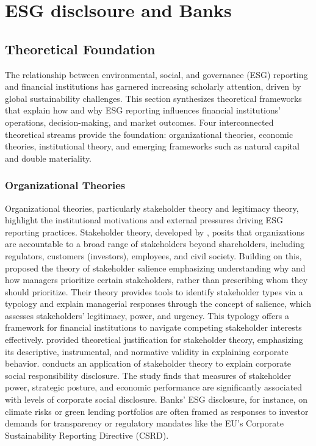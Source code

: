 \documentclass[
  authoryear]{elsarticle}
\begin{document}
\section{ESG disclsoure and Banks}\label{esg-disclsoure-and-banks}

\subsection{Theoretical Foundation}\label{theoretical-foundation}

The relationship between environmental, social, and governance (ESG)
reporting and financial institutions has garnered increasing scholarly
attention, driven by global sustainability challenges. This section
synthesizes theoretical frameworks that explain how and why ESG
reporting influences financial institutions' operations,
decision-making, and market outcomes. Four interconnected theoretical
streams provide the foundation: organizational theories, economic
theories, institutional theory, and emerging frameworks such as natural
capital and double materiality.

\subsubsection{Organizational Theories}\label{organizational-theories}

Organizational theories, particularly stakeholder theory and legitimacy
theory, highlight the institutional motivations and external pressures
driving ESG reporting practices. Stakeholder theory, developed by
\citet{FREEMAN1984}, posits that organizations are accountable to a
broad range of stakeholders beyond shareholders, including regulators,
customers (investors), employees, and civil society. Building on this,
\citet{MITCHELL1997} proposed the theory of stakeholder salience
emphasizing understanding why and how managers prioritize certain
stakeholders, rather than prescribing whom they should prioritize. Their
theory provides tools to identify stakeholder types via a typology and
explain managerial responses through the concept of salience, which
assesses stakeholders' legitimacy, power, and urgency. This typology
offers a framework for financial institutions to navigate competing
stakeholder interests effectively. \citet{DONALDSON1995} provided
theoretical justification for stakeholder theory, emphasizing its
descriptive, instrumental, and normative validity in explaining
corporate behavior. \citet{ROBERTS1992} conducts an application of
stakeholder theory to explain corporate social responsibility
disclosure. The study finds that measures of stakeholder power,
strategic posture, and economic performance are significantly associated
with levels of corporate social disclosure. Banks' ESG disclosure, for
instance, on climate risks or green lending portfolios are often framed
as responses to investor demands for transparency or regulatory mandates
like the EU's Corporate Sustainability Reporting Directive (CSRD).
\end{document}
